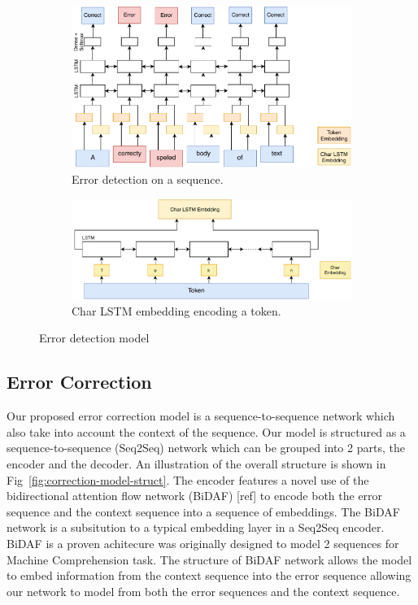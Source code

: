 \begin{figure}
    \centering
    \begin{subfigure}{.5\textwidth}
        \centering
        \includegraphics[width=.8\linewidth]{diagrams/detection-model.pdf}
        \caption{Error detection on a sequence.}
        \label{fig:detection-model-struct}
    \end{subfigure}%
    \begin{subfigure}{.5\textwidth}
        \centering
        \includegraphics[width=.8\linewidth]{diagrams/char-lstm-encoder.pdf}
        \caption{Char LSTM embedding encoding a token.}
        \label{fig:char-lstm-encoder}
    \end{subfigure}
    \caption{Error detection model}
    \label{fig:detection-model}
\end{figure}

\subsection*{Error Correction}

Our proposed error correction model is a sequence-to-sequence network which also take into account the context of the sequence. Our model is structured as a sequence-to-sequence (Seq2Seq) network which can be grouped into 2 parts, the encoder and the decoder. An illustration of the overall structure is shown in Fig~\ref{fig:correction-model-struct}. The encoder features a novel use of the bidirectional attention flow network (BiDAF) [ref] to encode both the error sequence and the context sequence into a sequence of embeddings. The BiDAF network is a subsitution to a typical embedding layer in a Seq2Seq encoder. BiDAF is a proven achitecure was originally designed to model 2 sequences for Machine Comprehension task. The structure of BiDAF network allows the model to embed information from the context sequence into the error sequence allowing our network to model from both the error sequences and the context sequence.

